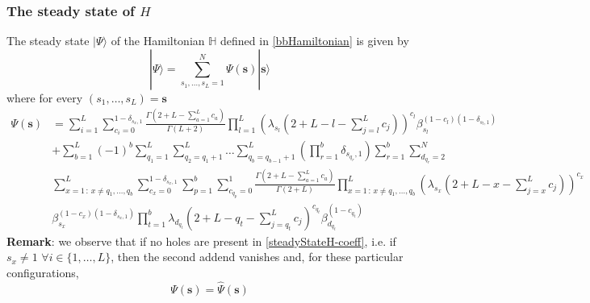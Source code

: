 \documentclass[11pt]{article}
\numberwithin{equation}{section}
\numberwithin{equation}{subsection}
\begin{document}
\subsubsection{The steady state of $H$}
The steady state $|\Psi\rangle$ of the Hamiltonian $\mathbb{H}$ defined in \eqref{bbHamiltonian} is given by 
\begin{equation}\label{steadyStateH}
    |\Psi\rangle=\sum_{s_{1},\ldots,s_{L}=1}^{N}\Psi(\bm{s})|\bm{s}\rangle
\end{equation}
where for every $(s_{1},\ldots,s_{L})=\bm{s}$
\begin{equation}\label{steadyStateH-coeff}
    \begin{split}
        \Psi(\bm{s})&=\sum_{i=1}^{L}\sum_{c_{i}=0}^{1-\delta_{s_{x},1}}\frac{\Gamma(2+L-\sum_{a=1}^{L}c_{a})}{\Gamma(L+2)}\prod_{l=1}^{L}\left(\lambda_{s_{l}}\left(2+L-l-\sum_{j=l}^{L}c_{j}\right)\right)^{c_{l}}\beta_{s_{l}}^{(1-c_{l})(1-\delta_{s_{l},1})}
        \\&+
        \sum_{b=1}^{L}(-1)^{b}\sum_{q_{1}=1}^{L}\sum_{q_{2}=q_{1}+1}^{L}\ldots\sum_{q_{b}=q_{b-1}+1}^{L}\left(\prod_{r=1}^{b}\delta_{s_{q_{r}},1}\right) 
        \sum_{r=1}^{b}\sum_{d_{q_{r}}=2}^{N}
\\&
\sum_{x=1\,:\, x\neq q_{1},\ldots,q_{b}}^{L}\sum_{c_{x}=0}^{1-\delta_{s_{x},1}}\sum_{p=1}^{b}\sum_{c_{q_{p}}=0}^{1}\frac{\Gamma(2+L-\sum_{a=1}^{L}c_{a})}{\Gamma(2+L)}
  \prod_{x=1\,:\, x\neq q_{1},\ldots,q_{b}}^{L}\left(\lambda_{s_{x}}\left(2+L-x-\sum_{j=x}^{L}c_{j}\right)\right)^{c_{x}}
 \\ &
 \beta_{s_{x}}^{(1-c_{x})(1-\delta_{s_{x},1})}
 \prod_{t=1}^{b}\lambda_{d_{q_{t}}}\left(2+L-q_{t}-\sum_{j=q_{t}}^{L}c_{j}\right)^{c_{q_{t}}}\beta_{d_{q_{t}}}^{(1-c_{q_{t}})}
    \end{split}
\end{equation}
\textbf{Remark}: we observe that if no holes are present in \eqref{steadyStateH-coeff}, i.e. if $s_{x}\neq 1$ $\forall i\in \{1,\ldots,L\}$, then the second addend vanishes and, for these particular configurations, 
\begin{equation}\label{LinkABS-corr}
\Psi(\bm{s})=\widehat{\Psi}(\bm{s})
\end{equation}
\end{document}
